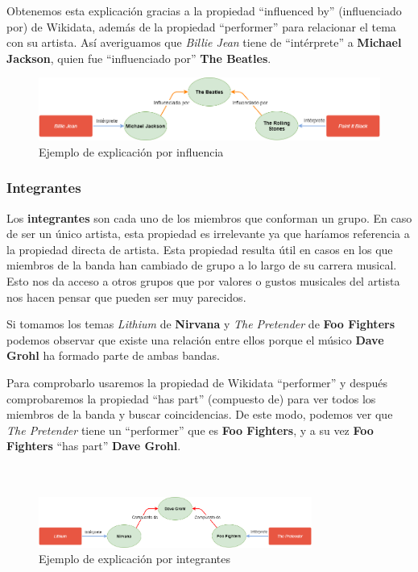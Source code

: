 Obtenemos esta explicación gracias a la propiedad ``influenced by'' (influenciado por) de Wikidata, además de la propiedad ``performer'' para relacionar el tema con su artista. Así averiguamos que \textit{Billie Jean} tiene de ``intérprete'' a \textbf{Michael Jackson}, quien fue ``influenciado por'' \textbf{The Beatles}.

\begin{figure}[h!]
	\centering
	\includegraphics[width = 1\textwidth]{Imagenes/Bitmap/Influencia ejemplo.png}
	\caption{Ejemplo de explicación por influencia}
	\label{fig:sampleImage}
\end{figure}

\subsubsection*{Integrantes}

Los \textbf{integrantes} son cada uno de los miembros que conforman un grupo. En caso de ser un único artista, esta propiedad es irrelevante ya que haríamos referencia a la propiedad directa de artista. Esta propiedad resulta útil en casos en los que miembros de la banda han cambiado de grupo a lo largo de su carrera musical. Esto nos da acceso a otros grupos que por valores o gustos musicales del artista nos hacen pensar que pueden ser muy parecidos.

Si tomamos los temas \textit{Lithium} de \textbf{Nirvana} y \textit{The Pretender} de \textbf{Foo Fighters} podemos observar que existe una relación entre ellos porque el músico \textbf{Dave Grohl} ha formado parte de ambas bandas.

Para comprobarlo usaremos la propiedad de Wikidata ``performer'' y después comprobaremos la propiedad ``has part'' (compuesto de) para ver todos los miembros de la banda y buscar coincidencias. De este modo, podemos ver que \textit{The Pretender} tiene un ``performer'' que es \textbf{Foo Fighters}, y a su vez \textbf{Foo Fighters} ``has part'' \textbf{Dave Grohl}.\\\\\\

\begin{figure}[h!]
	\centering
	\includegraphics[width = 0.8\textwidth]{Imagenes/Bitmap/Integrante ejemplo.png}
	\caption{Ejemplo de explicación por integrantes}
	\label{fig:sampleImage}
\end{figure}

